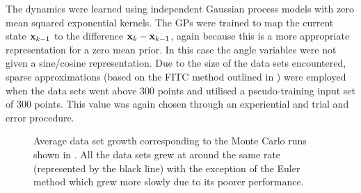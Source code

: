 The dynamics were learned using independent Gaussian process models with zero mean squared exponential kernels. The GPs were trained to map the current state $\mathbf{x}_{k-1}$ to the difference $\mathbf{x}_k-\mathbf{x}_{k-1}$, again because this is a more appropriate representation for a zero mean prior. In this case the angle variables were not given a sine/cosine representation.
%
Due to the size of the data sets encountered, sparse approximations (based on the FITC method outlined in ) were employed when the data sets went above 300 points and utilised a pseudo-training input set of 300 points. This value was again chosen through an experiential and trial and error procedure.



\begin{figure}
\centering \small
{}
\caption{Average data set growth corresponding to the Monte Carlo runs shown in . All the data sets grew at around the same rate (represented by the black line) with the exception of the Euler method which grew more slowly due to its poorer performance.}
\label{fig:uni_datasize}
\end{figure}




